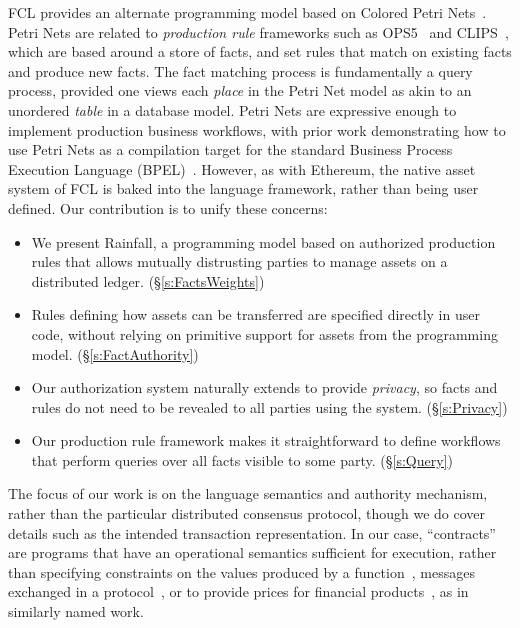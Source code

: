 FCL provides an alternate programming model based on Colored Petri Nets~\cite{Jensen1981:ColouredPetri}. Petri Nets are related to \emph{production rule} frameworks such as OPS5~\cite{Forgy1981:OPS5} and CLIPS~\cite{Riley2017:CLIPS}, which are based around a store of facts, and set rules that match on existing facts and produce new facts. The fact matching process is fundamentally a query process, provided one views each \emph{place} in the Petri Net model as akin to an unordered \emph{table} in a database model. Petri Nets are expressive enough to implement production business workflows, with prior work demonstrating how to use Petri Nets as a compilation target for the standard Business Process Execution Language (BPEL)~\cite{Lohmann2009:PetriBPEL}.  However, as with Ethereum, the native asset system of FCL is baked into the language framework, rather than being user defined. Our contribution is to unify these concerns:


\begin{itemize}
\item We present Rainfall, a programming model based on authorized production rules that allows mutually distrusting parties to manage assets on a distributed ledger. (\S\ref{s:FactsWeights})

\item Rules defining how assets can be transferred are specified directly in user code, without relying on primitive support for assets from the programming model. (\S\ref{s:FactAuthority})

\item Our authorization system naturally extends to provide \emph{privacy}, so facts and rules do not need to be revealed to all parties using the system. (\S\ref{s:Privacy})

\item Our production rule framework makes it straightforward to define workflows that perform queries over all facts visible to some party. (\S\ref{s:Query})

\end{itemize}

The focus of our work is on the language semantics and authority mechanism, rather than the particular distributed consensus protocol, though we do cover details such as the intended transaction representation. In our case, ``contracts'' are programs that have an operational semantics sufficient for execution, rather than specifying constraints on the values produced by a function~\cite{Findler2002:Contracts}, messages exchanged in a protocol~\cite{Das2019:Resource, Deon2019:CSL}, or to provide prices for financial products~\cite{PeytonJones2000:Composing}, as in similarly named work.




